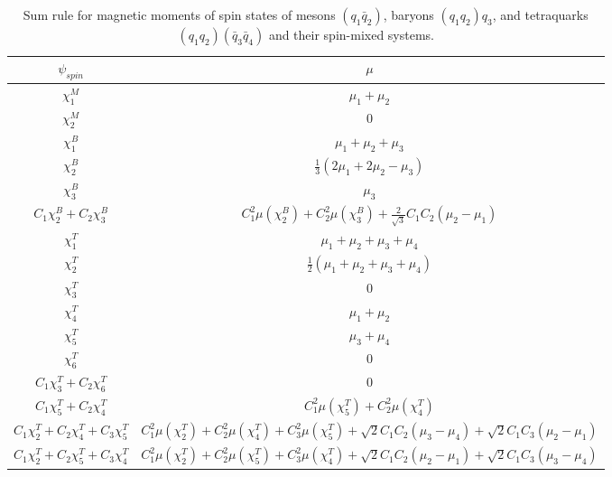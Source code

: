 \documentclass[12pt,prd,onecolumn,floatfix,nofootinbib]{revtex4}
\begin{document}
\renewcommand{\tabcolsep}{0.41cm} \renewcommand{\arraystretch}{1.2}
\begin{table}[!htb]
\caption{Sum rule for magnetic moments of spin states of
mesons $\left(q_{1}{\bar{q}}_{2}\right)$, baryons $\left(q_{1}q_{2}\right)q_{3}$,
and tetraquarks $\left(q_{1}q_{2}\right)\left({\bar{q}}_{3}{\bar{q}}_{4}\right)$
and their spin-mixed systems.}
\label{tab:musum}%
\begin{tabular}{cc}
\hline\hline
$\psi_{spin}$ & $\mu$ \\ \hline
$\chi_{1}^{M}$ & $\mu_{1}+\mu_{2}$ \\
$\chi_{2}^{M}$ & 0 \\
$\chi_{1}^{B}$ & $\mu_{1}+\mu_{2}+\mu_{3}$
\\
$\chi_{2}^{B}$ & $\frac{1}{3}\left(2\mu_{1}+2\mu_{2}-\mu_{3}\right)$ \\
$\chi_{3}^{B}$ & $\mu_{3}$ \\
$C_{1}\chi_{2}^{B}+C_{2}\chi_{3}^{B}$ & $C_{1}^{2}\mu\left(\chi_{2}^{B}%
\right) + C_{2}^{2}\mu\left(\chi_{3}^{B}\right) + \frac{2}{\sqrt{3}}%
C_{1}C_{2}\left(\mu_{2}-\mu_{1}\right)$ \\
$\chi_{1}^{T}$ & $\mu_{1}+\mu_{2}+\mu_{3}+\mu_{4}$ \\
$\chi_{2}^{T}$ & $\frac{1}{2}\left(\mu_{1}+\mu_{2}+\mu_{3}+\mu_{4}\right)$
\\
$\chi_{3}^{T}$ & 0 \\
$\chi_{4}^{T}$ & $\mu_{1}+\mu_{2}$ \\
$\chi_{5}^{T}$ & $\mu_{3}+\mu_{4}$ \\
$\chi_{6}^{T}$ & 0 \\
$C_{1}\chi_{3}^{T}+C_{2}\chi_{6}^{T}$ & 0 \\
$C_{1}\chi_{5}^{T}+C_{2}\chi_{4}^{T}$ & $C_{1}^{2}\mu\left(\chi_{5}^{T}%
\right) + C_{2}^{2}\mu\left(\chi_{4}^{T}\right)$ \\
$C_{1}\chi_{2}^{T}+C_{2}\chi_{4}^{T}+C_{3}\chi_{5}^{T}$ & $%
C_{1}^{2}\mu\left(\chi_{2}^{T}\right) +
C_{2}^{2}\mu\left(\chi_{4}^{T}\right) +
C_{3}^{2}\mu\left(\chi_{5}^{T}\right) + \sqrt{2}C_{1}C_{2}\left(\mu_{3}-%
\mu_{4}\right) + \sqrt{2}C_{1}C_{3}\left(\mu_{2}-\mu_{1}\right)$ \\
$C_{1}\chi_{2}^{T}+C_{2}\chi_{5}^{T}+C_{3}\chi_{4}^{T}$ & $%
C_{1}^{2}\mu\left(\chi_{2}^{T}\right) +
C_{2}^{2}\mu\left(\chi_{5}^{T}\right) +
C_{3}^{2}\mu\left(\chi_{4}^{T}\right) + \sqrt{2}C_{1}C_{2}\left(\mu_{2}-%
\mu_{1}\right) + \sqrt{2}C_{1}C_{3}\left(\mu_{3}-\mu_{4}\right)$ \\
\hline\hline
\end{tabular}%
\end{table}
\end{document}

